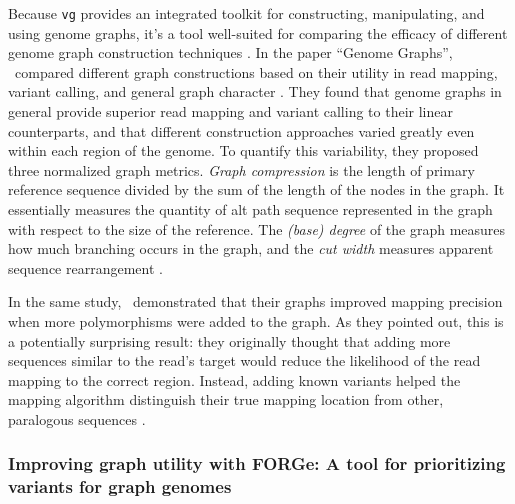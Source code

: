 Because \texttt{vg} provides an integrated toolkit for constructing, manipulating, and using genome graphs, it's a tool well-suited for comparing the efficacy of different genome graph construction techniques \cite{Novak_2017, Garrison_2018}.
In the paper ``Genome Graphs'', \citeauthor{Novak_2017a}\ compared different graph constructions based on their utility in read mapping, variant calling, and general graph character \citep{Novak_2017a} .
They found that genome graphs in general provide superior read mapping and variant calling to their linear counterparts, and that different construction approaches varied greatly even within each region of the genome.
To quantify this variability, they proposed three normalized graph metrics.
 \emph{Graph compression} is the length of primary reference sequence divided by the sum of the length of the nodes in the graph.
It essentially measures the quantity of alt path sequence represented in the graph with respect to the size of the reference.
The \emph{(base) degree} of the graph measures how much branching occurs in the graph, and the \emph{cut width} measures apparent sequence rearrangement .


In the same study, \citeauthor{Novak_2017a}\ demonstrated that their graphs improved mapping precision when more polymorphisms were added to the graph.
As they pointed out, this is a potentially surprising result: they originally thought that adding more sequences similar to the read's target would reduce the likelihood of the read mapping to the correct region.
Instead, adding known variants helped the mapping algorithm distinguish their true mapping location from other, paralogous sequences \citep{Novak_2017a}.

\subsubsection{Improving graph utility with FORGe: A tool for prioritizing variants for graph genomes}

